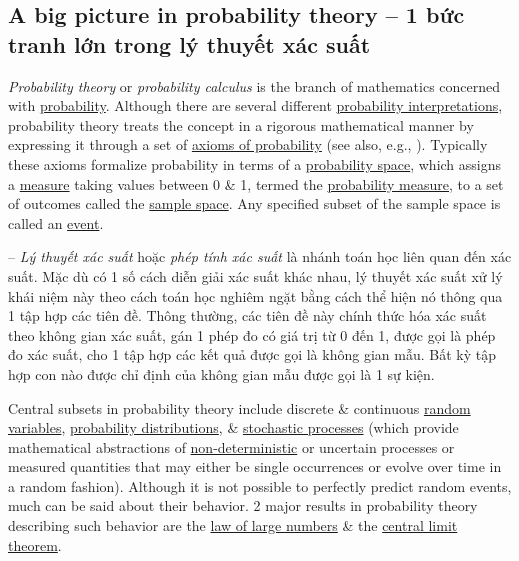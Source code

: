 \documentclass{article}
\begin{document}

\subsection{A big picture in probability theory -- 1 bức tranh lớn trong lý thuyết xác suất}
{\it Probability theory} or {\it probability calculus} is the branch of mathematics concerned with \href{https://en.wikipedia.org/wiki/Probability}{probability}. Although there are several different \href{https://en.wikipedia.org/wiki/Probability_interpretations}{probability interpretations}, probability theory treats the concept in a rigorous mathematical manner by expressing it through a set of \href{https://en.wikipedia.org/wiki/Axioms_of_probability}{axioms of probability} (see also, e.g., \cite{Popper_logic_science,Popper_logic_khoa_hoc}). Typically these axioms formalize probability in terms of a \href{https://en.wikipedia.org/wiki/Probability_space}{probability space}, which assigns a \href{https://en.wikipedia.org/wiki/Measure_(mathematics)}{measure} taking values between 0 \& 1, termed the \href{https://en.wikipedia.org/wiki/Probability_measure}{probability measure}, to a set of outcomes called the \href{https://en.wikipedia.org/wiki/Sample_space}{sample space}. Any specified subset of the sample space is called an \href{https://en.wikipedia.org/wiki/Event_(probability_theory)}{event}.

-- {\it Lý thuyết xác suất} hoặc {\it phép tính xác suất} là nhánh toán học liên quan đến xác suất. Mặc dù có 1 số cách diễn giải xác suất khác nhau, lý thuyết xác suất xử lý khái niệm này theo cách toán học nghiêm ngặt bằng cách thể hiện nó thông qua 1 tập hợp các tiên đề. Thông thường, các tiên đề này chính thức hóa xác suất theo không gian xác suất, gán 1 phép đo có giá trị từ 0 đến 1, được gọi là phép đo xác suất, cho 1 tập hợp các kết quả được gọi là không gian mẫu. Bất kỳ tập hợp con nào được chỉ định của không gian mẫu được gọi là 1 sự kiện.

Central subsets in probability theory include discrete \& continuous \href{https://en.wikipedia.org/wiki/Random_variable}{random variables}, \href{https://en.wikipedia.org/wiki/Probability_distributions}{probability distributions}, \& \href{https://en.wikipedia.org/wiki/Stochastic_process}{stochastic processes} (which provide mathematical abstractions of \href{https://en.wikipedia.org/wiki/Determinism}{non-deterministic} or uncertain processes or measured quantities that may either be single occurrences or evolve over time in a random fashion). Although it is not possible to perfectly predict random events, much can be said about their behavior. 2 major results in probability theory describing such behavior are the \href{https://en.wikipedia.org/wiki/Law_of_large_numbers}{law of large numbers} \& the \href{https://en.wikipedia.org/wiki/Central_limit_theorem}{central limit theorem}.
\end{document}

